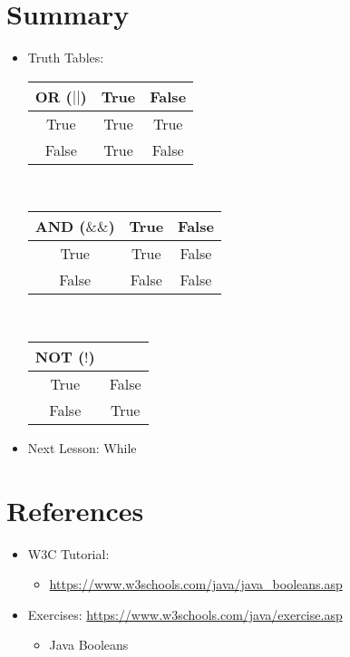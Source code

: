 \documentclass[a4paper]{article}
\begin{document}
	\section{Summary}
	\begin{itemize}
		\item Truth Tables:\\
		\begin{tabular}{c | c c}
			OR ($||$) & True & False \\
			\hline
			True	& True & True \\
			False	& True & False\\
		\end{tabular}\\
		\par
		\begin{tabular}{c | c c}
			AND ($\&\&$) & True & False \\
			\hline
			True	& True & False \\
			False	& False & False\\
		\end{tabular}\\
		\par
		\begin{tabular}{c | c}
			NOT ($!$) &\\
			\hline
			True	& False \\
			False	& True \\
		\end{tabular}
		\item Next Lesson: While
	\end{itemize}
	
	\section{References}
	\begin{itemize}
		\item W3C Tutorial: 
		\begin{itemize}
			\item \url{https://www.w3schools.com/java/java_booleans.asp}
		\end{itemize}
		\item Exercises: \url{https://www.w3schools.com/java/exercise.asp}
		\begin{itemize}
			\item Java Booleans
		\end{itemize}
	\end{itemize}
\end{document}
